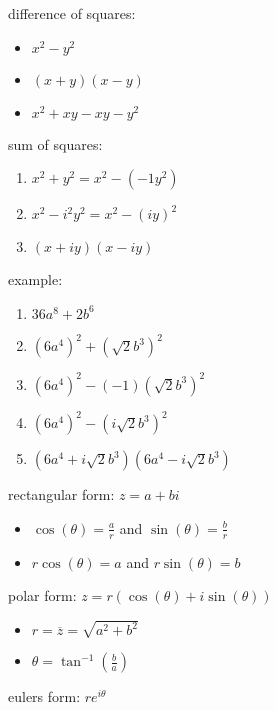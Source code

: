 \documentclass{article}
\begin{document}
difference of squares:
	\begin{itemize}
		\item $x^2 - y^2$
		\item $(x + y)(x - y)$
		\item $x^2 + xy -xy - y^2$
	\end{itemize}

sum of squares:
	\begin{enumerate}
		\item $x^2 + y^2 = x^2 - (-1y^2)$
		\item $x^2 - i^2y^2 = x^2 - (iy)^2$
		\item $(x + iy)(x - iy)$
	\end{enumerate}

example:
	\begin{enumerate}
		\item $36a^8 + 2b^6$
		\item $(6a^4)^2 + (\sqrt{2}b^3)^2$
		\item $(6a^4)^2 - (-1)(\sqrt{2}b^3)^2$
		\item $(6a^4)^2 - (i\sqrt{2}b^3)^2$
		\item $(6a^4 + i\sqrt{2}b^3)(6a^4 - i\sqrt{2}b^3)$
	\end{enumerate}

rectangular form: $z = a + bi$\\
	\begin{itemize}
		\item $\cos(\theta) = \frac{a}{r}$ and $\sin(\theta) = \frac{b}{r}$
		\item $r\cos(\theta) = a$ and $r\sin(\theta) = b$
	\end{itemize}
polar form: $z = r(\cos(\theta) + i\sin(\theta))$
	\begin{itemize}
		\item $r = \overline{z} = \sqrt{a^2 + b^2}$
		\item $\theta = \tan^{-1}(\frac{b}{a})$
	\end{itemize}
eulers form: $re^{i\theta}$\\
\end{document}
